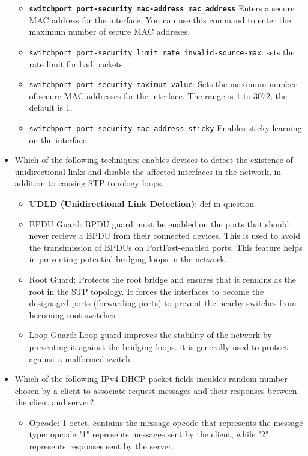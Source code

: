 \begin{itemize}
    \begin{itemize}
        \item \textbf{\verb|switchport port-security mac-address mac_address|} Enters a secure MAC address for the interface. You can use this command to enter the maximum number of secure MAC addreses.
        \item \verb|switchport port-security limit rate invalid-source-max|: sets the rate limit for bad packets.
        \item \verb|switchport port-security maximum value|: Sets the maximum number of secure MAC addresses for the interface. The range is 1 to 3072; the default is 1.
        \item \verb|switchport port-security mac-address sticky| Enables sticky learning on the interface.
    \end{itemize}
    \item Which of the following techniques enables devices to detect the existence of unidirectional links and disable the affected interfaces in the network, in addition to causing STP topology loops.
    \begin{itemize}
        \item \textbf{UDLD (Unidirectional Link Detection)}: def in question
        \item BPDU Guard: BPDU guard must be enabled on the ports that should never recieve a BPDU from their connected devices. This is used to avoid the transimission of BPDUs on PortFast-enabled ports. This feature helps in preventing potential bridging loops in the network.
        \item Root Guard: Protects the root bridge and ensures that it remains as the root in the STP topology. It forces the interfaces to become the designaged ports (forwarding ports) to prevent the nearby switches from becoming root switches.
        \item Loop Guard: Loop guard improves the stability of the network by preventing it against the bridging loops. it is generally used to protect against a malformed switch.
    \end{itemize}
    \item Which of the following IPv4 DHCP packet fields inculdes random number chosen by a client to associate request messages and their responses between the client and server?
    \begin{itemize}
        \item Opcode: 1 octet, contains the message opcode that represents the message type: opcode "1" represents messages sent by the client, while "2" represents responses sent by the server.

\end{itemize}
\end{itemize}
